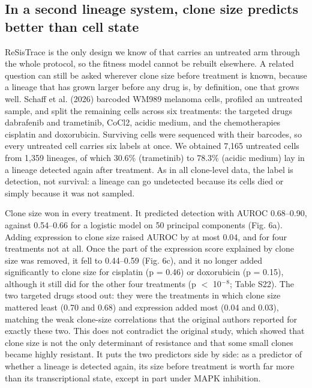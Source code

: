 \documentclass[11pt,a4paper]{article}
\begin{document}
\subsection*{In a second lineage system, clone size predicts better than cell state}

ReSisTrace is the only design we know of that carries an untreated arm through the whole protocol, so the fitness model cannot be rebuilt elsewhere. A related question can still be asked wherever clone size before treatment is known, because a lineage that has grown larger before any drug is, by definition, one that grows well. Schaff et al. (2026) barcoded WM989 melanoma cells, profiled an untreated sample, and split the remaining cells across six treatments: the targeted drugs dabrafenib and trametinib, CoCl2, acidic medium, and the chemotherapies cisplatin and doxorubicin. Surviving cells were sequenced with their barcodes, so every untreated cell carries six labels at once. We obtained 7,165 untreated cells from 1,359 lineages, of which 30.6\% (trametinib) to 78.3\% (acidic medium) lay in a lineage detected again after treatment. As in all clone-level data, the label is detection, not survival: a lineage can go undetected because its cells died or simply because it was not sampled.

Clone size won in every treatment. It predicted detection with AUROC 0.68--0.90, against 0.54--0.66 for a logistic model on 50 principal components (Fig. 6a). Adding expression to clone size raised AUROC by at most 0.04, and for four treatments not at all. Once the part of the expression score explained by clone size was removed, it fell to 0.44--0.59 (Fig. 6c), and it no longer added significantly to clone size for cisplatin (p = 0.46) or doxorubicin (p = 0.15), although it still did for the other four treatments (p $<$ 10$^-$$^8$; Table S22). The two targeted drugs stood out: they were the treatments in which clone size mattered least (0.70 and 0.68) and expression added most (0.04 and 0.03), matching the weak clone-size correlations that the original authors reported for exactly these two. This does not contradict the original study, which showed that clone size is not the only determinant of resistance and that some small clones became highly resistant. It puts the two predictors side by side: as a predictor of whether a lineage is detected again, its size before treatment is worth far more than its transcriptional state, except in part under MAPK inhibition.
\end{document}

